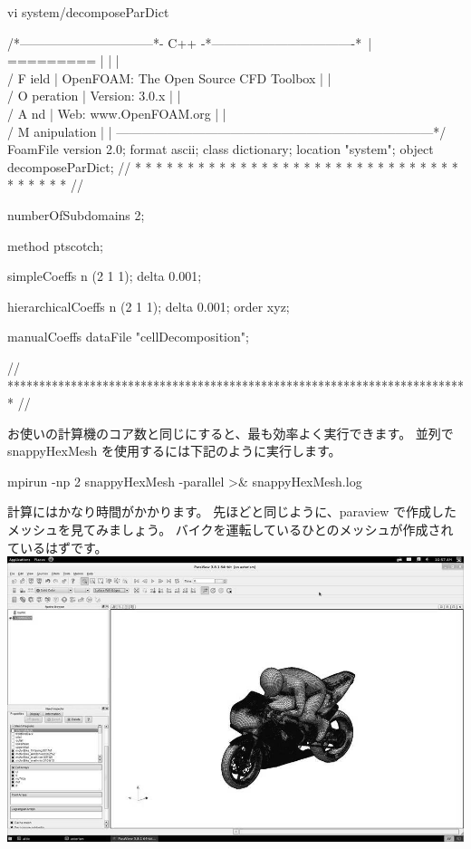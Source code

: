 \documentclass[mingoth,a4paper]{jsarticle}
\begin{document}
\begin{commandline}
vi system/decomposeParDict

/*--------------------------------*- C++ -*----------------------------------*\
| =========                 |                                                 |
| \\      /  F ield         | OpenFOAM: The Open Source CFD Toolbox           |
|  \\    /   O peration     | Version:  3.0.x                                 |
|   \\  /    A nd           | Web:      www.OpenFOAM.org                      |
|    \\/     M anipulation  |                                                 |
\*---------------------------------------------------------------------------*/
FoamFile
{
    version     2.0;
    format      ascii;
    class       dictionary;
    location    "system";
    object      decomposeParDict;
}
// * * * * * * * * * * * * * * * * * * * * * * * * * * * * * * * * * * * * * //

numberOfSubdomains 2;

method          ptscotch;

simpleCoeffs
{
    n               (2 1 1);
    delta           0.001;
}

hierarchicalCoeffs
{
    n               (2 1 1);
    delta           0.001;
    order           xyz;
}

manualCoeffs
{
    dataFile        "cellDecomposition";
}


// ************************************************************************* //
\end{commandline}

お使いの計算機のコア数と同じにすると、最も効率よく実行できます。
並列で snappyHexMesh を使用するには下記のように実行します。

\begin{commandline}
mpirun -np 2 snappyHexMesh -parallel >& snappyHexMesh.log
\end{commandline}

計算にはかなり時間がかかります。
先ほどと同じように、paraview で作成したメッシュを見てみましょう。
バイクを運転しているひとのメッシュが作成されているはずです。\\
\includegraphics[scale=0.5]{image201604/motorbike_mesh_mono.jpg}
\end{document}
